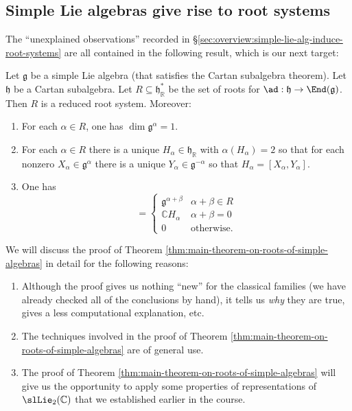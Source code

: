 \documentclass[reqno]{amsart} 
\begin{document}
\subsection{Simple Lie algebras give rise to root systems\label{sec:simple-lie-alg-give-roots}}
\label{sec:orgfacc967}
The ``unexplained observations'' recorded in \S\ref{sec:overview:simple-lie-alg-induce-root-systems} are all contained in the following result, which is our next target:
\begin{theorem}\label{thm:main-theorem-on-roots-of-simple-algebras}
  Let $\mathfrak{g}$ be a simple Lie algebra (that satisfies the Cartan subalgebra theorem).  Let $\mathfrak{h}$ be a Cartan subalgebra.  Let $R \subseteq \mathfrak{h}_\mathbb{R}^*$ be the set of roots for $\ad : \mathfrak{h} \rightarrow \End(\mathfrak{g})$.  Then $R$ is a reduced root system.  Moreover:
  \begin{enumerate}
  \item For each $\alpha \in R$, one has $\dim \mathfrak{g}^\alpha = 1$.
  \item For each $\alpha \in R$ there is a unique $H_\alpha \in \mathfrak{h}_\mathbb{R}$ with $\alpha(H_\alpha) = 2$ so that for each nonzero $X_\alpha \in \mathfrak{g}^\alpha$ there is a unique $Y_\alpha \in \mathfrak{g}^{-\alpha}$ so that $H_\alpha = [X_\alpha,Y_\alpha]$.
  \item One has
    \begin{equation*}
 [\mathfrak{g}^\alpha, \mathfrak{g}^\beta]
      = 
\begin{cases}
        \mathfrak{g}^{\alpha+\beta} & \alpha + \beta \in R \\
        \mathbb{C} H_\alpha  & \alpha + \beta = 0 \\
        0 & \text{otherwise.}
      \end{cases}
    \end{equation*}
  \end{enumerate}
\end{theorem}

\begin{remark}
  We will discuss the proof of Theorem \ref{thm:main-theorem-on-roots-of-simple-algebras} in detail for the following reasons:
  \begin{enumerate}
  \item Although the proof gives us nothing ``new'' for the classical families (we have already checked all of the conclusions by hand), it tells us \emph{why} they are true, gives a less computational explanation, etc.
  \item The techniques involved in the proof of Theorem \ref{thm:main-theorem-on-roots-of-simple-algebras} are of general use.
  \item The proof of Theorem \ref{thm:main-theorem-on-roots-of-simple-algebras} will give us the opportunity to apply some properties of representations of $\slLie_2(\mathbb{C})$ that we established earlier in the course.
  \end{enumerate}
\end{remark}
\end{document}
